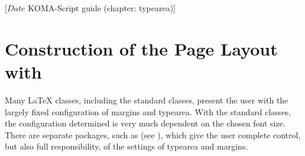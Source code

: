 %
%
%
%
%
%
%
%
% 
%
%
%
%

%
                 [$Date$
                  KOMA-Script guide (chapter: typearea)]


\chapter{Construction of the Page Layout with }

Many {\LaTeX} classes, including the standard classes, present the user
with the largely fixed configuration of margins and typearea. With the
standard classes, the configuration determined is very much dependent
on the chosen font size. There are
separate packages, such as
 (see
\cite{package:geometry}), which give the user complete control, but
also full responsibility, of the settings of typearea and margins.

